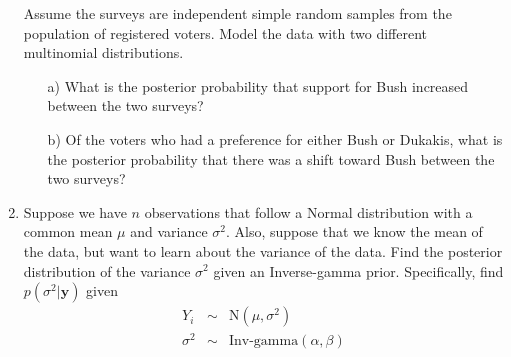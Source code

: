 \documentclass[10pt,a4paper]{article}
\begin{document}
\begin{enumerate}
Assume the surveys are independent simple random samples from the population of registered voters.  Model the data with two different multinomial distributions.
\begin{enumerate}
\item[a)] What is the posterior probability that support for Bush increased between the two surveys?
\item[b)] Of the voters who had a preference for either Bush or Dukakis, what is the posterior probability that there was a shift toward Bush between the two surveys?
\end{enumerate}

\bigskip

\item Suppose we have $n$ observations that follow a Normal distribution with a common mean $\mu$ and variance $\sigma^2$.  Also, suppose that we know the mean of the data, but want to learn about the variance of the data.  Find the posterior distribution of the variance $\sigma^2$ given an Inverse-gamma prior.  Specifically, find $p(\sigma^2 | \mathbf{y})$ given
\begin{eqnarray*}
Y_i &\sim& \text{N}(\mu, \sigma^2) \\
\sigma^2 &\sim& \text{Inv-gamma}(\alpha, \beta)
\end{eqnarray*}
\end{enumerate}
\end{document}
